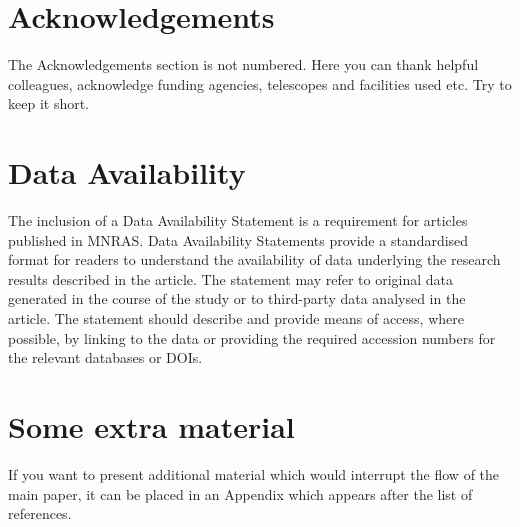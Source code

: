 \documentclass[fleqn,usenatbib]{mnras}
\begin{document}
\section*{Acknowledgements}

The Acknowledgements section is not numbered. Here you can thank helpful
colleagues, acknowledge funding agencies, telescopes and facilities used etc.
Try to keep it short.

\section*{Data Availability}

 
The inclusion of a Data Availability Statement is a requirement for articles published in MNRAS. Data Availability Statements provide a standardised format for readers to understand the availability of data underlying the research results described in the article. The statement may refer to original data generated in the course of the study or to third-party data analysed in the article. The statement should describe and provide means of access, where possible, by linking to the data or providing the required accession numbers for the relevant databases or DOIs.










\appendix

\section{Some extra material}

If you want to present additional material which would interrupt the flow of the main paper,
it can be placed in an Appendix which appears after the list of references.



\bsp	%
\label{lastpage}
\end{document}

